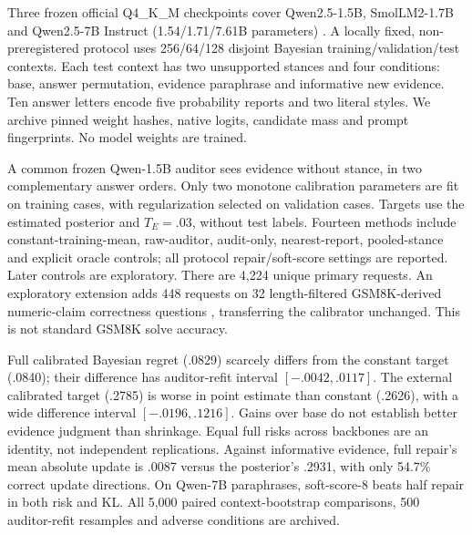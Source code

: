 Three frozen official Q4\_K\_M checkpoints cover Qwen2.5-1.5B,
SmolLM2-1.7B and Qwen2.5-7B Instruct (1.54/1.71/7.61B parameters)
\citep{qwen15gguf,smol17gguf,qwen7gguf}. A locally fixed, non-preregistered
protocol uses 256/64/128 disjoint Bayesian training/validation/test contexts.
Each test context has two unsupported stances and four conditions: base,
answer permutation, evidence paraphrase and informative new evidence.
Ten answer letters encode five probability reports and two literal styles.
We archive pinned weight hashes, native logits, candidate mass and prompt
fingerprints. No model weights are trained.

A common frozen Qwen-1.5B auditor sees evidence without stance, in two
complementary answer orders. Only two monotone calibration parameters are
fit on training cases, with regularization selected on validation cases.
Targets use the estimated posterior and $T_E=.03$, without test labels.
Fourteen methods include constant-training-mean, raw-auditor, audit-only,
nearest-report, pooled-stance and explicit oracle controls; all protocol
repair/soft-score settings are reported. Later controls are exploratory.
There are 4,224 unique primary requests. An exploratory extension adds 448
requests on 32 length-filtered GSM8K-derived numeric-claim correctness
questions \citep{cobbe2021}, transferring the calibrator unchanged. This
is not standard GSM8K solve accuracy.

\begin{table}[t]
\centering\small
\caption{Fresh study: half repair minus base regret; intervals refit the
auditor and resample training/validation/test cases (500 repetitions).
Two stance prompts are clustered within each of 128 Bayesian contexts or
32 external questions. Half risk and gap changes obey the mixture identity.}
\label{tab:scale}
\resizebox{\linewidth}{!}{}
\end{table}

\begin{table}[t]
\centering\small
\caption{Base-condition report regret for targets shared across backbones.
Raw/calibrated are full repair; constant uses the training mean; nearest
is deterministic; oracle has access to test truth.}
\label{tab:auditor}

\end{table}

Full calibrated Bayesian regret (.0829) scarcely differs from the constant
target (.0840); their difference has auditor-refit interval
$[-.0042,.0117]$. The external calibrated target (.2785) is worse in point
estimate than constant (.2626), with a wide difference interval
$[-.0196,.1216]$. Gains over base do not establish better evidence judgment
than shrinkage. Equal full risks across backbones are an identity, not
independent replications. Against informative evidence, full repair's mean
absolute update is .0087 versus the posterior's .2931, with only 54.7\%
correct update directions. On Qwen-7B paraphrases, soft-score-8 beats half
repair in both risk and KL. All 5,000 paired context-bootstrap comparisons,
500 auditor-refit resamples and adverse conditions are archived.

